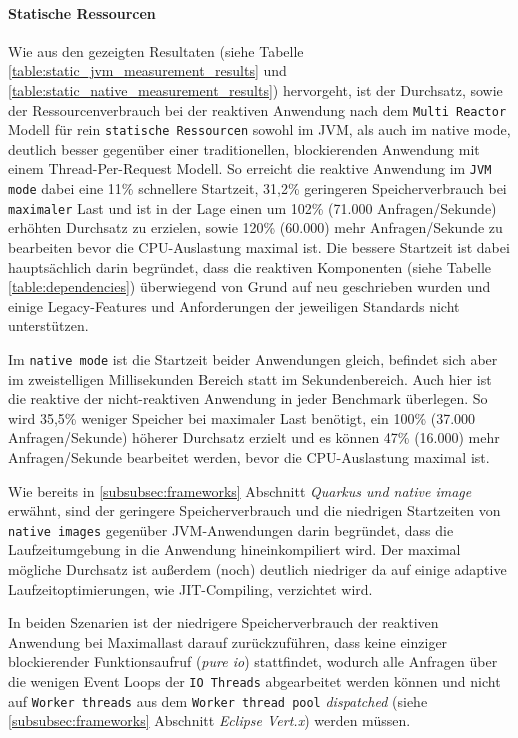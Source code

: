 \paragraph{Statische Ressourcen}
Wie aus den gezeigten Resultaten (siehe Tabelle \ref{table:static_jvm_measurement_results} und
\ref{table:static_native_measurement_results}) hervorgeht, ist der Durchsatz, sowie der Ressourcenverbrauch bei der
reaktiven Anwendung nach dem \verb|Multi Reactor| Modell für rein \verb|statische Ressourcen| sowohl im JVM, als auch im native mode,
deutlich besser gegenüber einer traditionellen, blockierenden Anwendung mit einem Thread-Per-Request Modell.
So erreicht die reaktive Anwendung im \verb|JVM mode| dabei eine 11\% schnellere Startzeit, 31,2\% geringeren Speicherverbrauch bei
\verb|maximaler| Last und ist in der Lage einen um 102\% (71.000 Anfragen/Sekunde) erhöhten Durchsatz zu erzielen,
sowie 120\% (60.000) mehr Anfragen/Sekunde zu bearbeiten bevor die CPU-Auslastung maximal ist.
Die bessere Startzeit ist dabei hauptsächlich darin begründet, dass die reaktiven Komponenten (siehe Tabelle \ref{table:dependencies})
überwiegend von Grund auf neu geschrieben wurden und einige Legacy-Features und Anforderungen der jeweiligen
Standards nicht unterstützen.

Im \verb|native mode| ist die Startzeit beider Anwendungen gleich, befindet sich aber im zweistelligen Millisekunden Bereich statt
im Sekundenbereich.
Auch hier ist die reaktive der nicht-reaktiven Anwendung in jeder Benchmark überlegen. So wird 35,5\% weniger Speicher bei maximaler Last
benötigt, ein 100\% (37.000 Anfragen/Sekunde) höherer  Durchsatz erzielt und es können 47\% (16.000) mehr Anfragen/Sekunde bearbeitet
werden, bevor die CPU-Auslastung maximal ist.

Wie bereits in \ref{subsubsec:frameworks} Abschnitt \textit{Quarkus und native image} erwähnt, sind der geringere Speicherverbrauch und
die niedrigen Startzeiten von \verb|native images| gegenüber JVM-Anwendungen darin begründet, dass die Laufzeitumgebung in die
Anwendung hineinkompiliert wird. Der maximal mögliche Durchsatz ist außerdem (noch) deutlich niedriger da auf einige adaptive
Laufzeitoptimierungen, wie JIT-Compiling, verzichtet wird.

In beiden Szenarien ist der niedrigere Speicherverbrauch der reaktiven Anwendung bei Maximallast darauf zurückzuführen, dass
keine einziger blockierender Funktionsaufruf (\textit{pure io}) stattfindet, wodurch alle Anfragen über die wenigen
Event Loops der \verb|IO Threads| abgearbeitet werden können und nicht auf \verb|Worker threads| aus dem \verb|Worker thread pool|
\textit{dispatched} (siehe \ref{subsubsec:frameworks} Abschnitt \textit{Eclipse Vert.x}) werden müssen.

